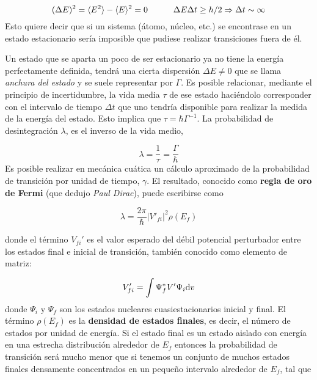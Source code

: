 \begin{equation}
	(\Delta E)^2 = \langle E^2 \rangle - \langle E \rangle^2 = 0 \quad \quad \quad \Delta E \Delta t \geq h / 2 \Rightarrow \Delta t \sim \infty
\end{equation}
Esto quiere decir que si un sistema (átomo, núcleo, etc.) se encontrase en un estado estacionario sería imposible que pudiese realizar transiciones fuera de él. %


Un estado que se aparta un poco de ser estacionario ya no tiene la energía perfectamente definida, tendrá una cierta dispersión $\Delta E \neq 0$ que se llama \textit{anchura del estado} y se suele representar por $\Gamma$. Es posible relacionar, mediante el principio de incertidumbre, la vida media $\tau$ de ese estado haciéndolo corresponder con el intervalo de tiempo $\Delta t$ que uno tendría disponible para realizar la medida de la energía del estado. Esto implica que $\tau=\hbar \Gamma^{-1}$. La probabilidad de desintegración $\lambda$, es el inverso de la vida medio,

\begin{equation}
	\lambda = \frac{1}{\tau} = \frac{\Gamma}{\hbar}
\end{equation}
Es posible realizar en mecánica cuática un cálculo aproximado de la probabilidad de transición por unidad de tiempo, $\gamma$. El resultado, conocido como \textbf{regla de oro de Fermi} (que dedujo \textit{Paul Dirac}), puede escribirse como

\begin{mybox}
\begin{equation}
	\lambda = \frac{2\pi}{\hbar} |V'_{fi}|^2 \rho (E_f)	\label{Ec:02-02-14}
\end{equation}
\end{mybox}
donde el término $V_{fi}'$ es el valor esperado del débil potencial perturbador entre los estados final e inicial de transición, también conocido como elemento de matriz:

\begin{equation}
	V_{fi}'= \int \Psi_f^* V' \Psi_i \mathrm{d} v
\end{equation}
donde $\Psi_i$ y $\Psi_f$ son los estados nucleares cuasiestacionarios inicial y final. El término $\rho(E_f)$ es la \textbf{densidad de estados finales}, es decir, el número de estados por unidad de energía. Si el estado final es un estado aislado con energía en una estrecha distribución alrededor de $E_f$ entonces la probabilidad de transición será mucho menor que si tenemos un conjunto de muchos estados finales densamente concentrados en un pequeño intervalo alrededor de $E_f$, tal que

